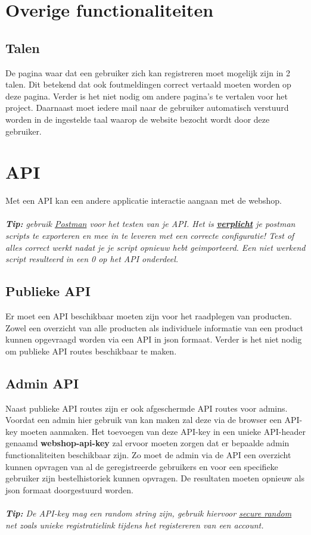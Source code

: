 \documentclass{article}
\begin{document}
\section{Overige functionaliteiten}
\subsection{Talen}
De pagina waar dat een gebruiker zich kan registreren moet mogelijk zijn in 2 talen. Dit betekend dat ook foutmeldingen correct vertaald moeten worden op deze pagina. Verder is het niet nodig om andere pagina's te vertalen voor het project. Daarnaast moet iedere mail naar de gebruiker automatisch verstuurd worden in de ingestelde taal waarop de website bezocht wordt door deze gebruiker.

\section{API}
Met een API kan een andere applicatie interactie aangaan met de webshop. 
\\
\\
\textit{\textbf{Tip:} gebruik \href{https://www.postman.com/downloads/}{Postman} voor het testen van je API. Het is \underline{\textbf{verplicht}} je postman scripts te exporteren en mee in te leveren met een correcte configuratie! Test of alles correct werkt nadat je je script opnieuw hebt geimporteerd. Een niet werkend script resulteerd in een 0 op het API onderdeel.}

\subsection{Publieke API}
Er moet een API beschikbaar moeten zijn voor het raadplegen van producten. Zowel een overzicht van alle producten als individuele informatie van een product kunnen opgevraagd worden via een API in json formaat. Verder is het niet nodig om publieke API routes beschikbaar te maken.

\subsection{Admin API}
Naast publieke API routes zijn er ook afgeschermde API routes voor admins. Voordat een admin hier gebruik van kan maken zal deze via de browser een API-key moeten aanmaken. Het toevoegen van deze API-key in een unieke API-header genaamd \textbf{webshop-api-key} zal ervoor moeten zorgen dat er bepaalde admin functionaliteiten beschikbaar zijn. Zo moet de admin via de API een overzicht kunnen opvragen van al de geregistreerde gebruikers en voor een specifieke gebruiker zijn bestelhistoriek kunnen opvragen. De resultaten moeten opnieuw als json formaat doorgestuurd worden.
\\
\\
\textit{\textbf{Tip:} De API-key mag een random string zijn, gebruik hiervoor \href{https://hex.pm/packages/secure_random}{secure random} net zoals unieke registratielink tijdens het registereren van een account.}
\end{document}
